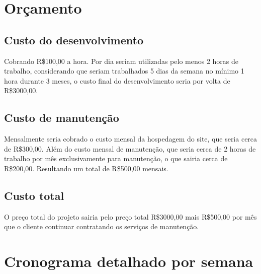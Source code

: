 \documentclass[a4paper]{abntex2}
\begin{document}
\section{Orçamento}

\subsection{Custo do desenvolvimento}

Cobrando R\$100,00 a hora. Por dia seriam utilizadas pelo menos 2 horas de trabalho, considerando que seriam trabalhados 5 dias da semana no mínimo 1 hora durante 3 meses, o custo final do desenvolvimento seria por volta de R\$3000,00.

\subsection{Custo de manutenção}

Mensalmente seria cobrado o custo mensal da hospedagem do site, que seria cerca de R\$300,00. Além do custo mensal de manutenção, que seria cerca de 2 horas de trabalho por mês exclusivamente para manutenção, o que sairia cerca de R\$200,00. Resultando um total de R\$500,00 mensais.

\subsection{Custo total}

O preço total do projeto sairia pelo preço total R\$3000,00 mais R\$500,00 por mês que o cliente continuar contratando os serviços de manutenção.

\section{Cronograma detalhado por semana}
\end{document}
